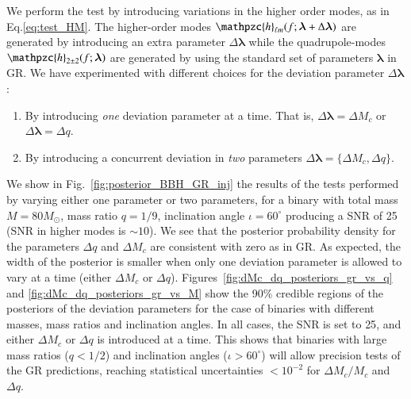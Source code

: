 \documentclass[prl,preprintnumbers,twocolumn,eqsecnum,floatfix,a4paper,nofootinbib,superscriptaddress]{revtex4}
\newcommand{\h}{\mathpzc{h}}
\newcommand{\hlm}{\mathpzc{h}_{\ell m}}
\newcommand{\blambda}{\bm{\lambda}}
\begin{document}
We perform the test by introducing variations in the higher order modes, as in Eq.\eqref{eq:test_HM}. The higher-order modes $\hlm(f; \blambda+\Delta\blambda)$ are generated by introducing an extra parameter $\Delta\blambda$ while the quadrupole-modes $\h_{2\pm2}(f; \blambda)$ are generated by using the standard set of parameters $\blambda$ in GR. We have experimented with different choices for the deviation parameter $\Delta\blambda$: 
\begin{enumerate}
\item By introducing \emph{one} deviation parameter at a time. That is, $\Delta\blambda = {\Delta M_c}$ or $\Delta\blambda = {\Delta q}$. 
\item By introducing a concurrent deviation in \emph{two} parameters $\Delta \blambda = \{\Delta M_c, \Delta q\}$. 
\end{enumerate}
We show in Fig.~\ref{fig:posterior_BBH_GR_inj} the results of the tests performed by varying either one parameter or two parameters, for a binary with total mass $M = 80M_{\odot}$, mass ratio $q=1/9$, inclination angle $ {\iota}=60^{\circ} $ producing a SNR of 25 (SNR in higher modes is $\sim 10$). We see that the posterior probability density for the parameters $\Delta q$ and $\Delta M_c$ are consistent with zero as in GR. As expected, the width of the posterior is smaller when only one deviation parameter is allowed to vary at a time (either $\Delta M_c$ or $\Delta q$). Figures~\ref{fig:dMc_dq_posteriors_gr_vs_q} and \ref{fig:dMc_dq_posteriors_gr_vs_M} show the 90\% credible regions of the posteriors of the deviation parameters for the case of binaries with different masses, mass ratios and inclination angles. In all cases, the SNR is set to {25}, and either $\Delta M_c$ or $\Delta q$ is introduced at a time.  This shows that binaries with large mass ratios ($q < 1/ 2$) and inclination angles ($\iota > 60 ^\circ $) will allow precision tests of the GR predictions, reaching statistical uncertainties $< 10^{-2}$ for $\Delta M_c/M_c$ and $\Delta q$.  
\end{document}
